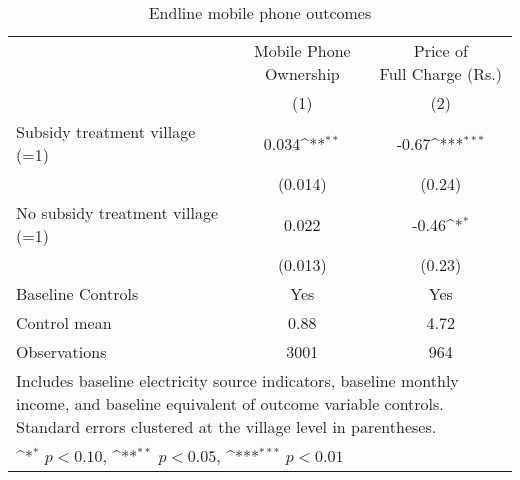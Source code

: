 \begin{table}[htbp]\centering
\def\sym#1{\ifmmode^{#1}\else\(^{#1}\)\fi}
\caption{Endline mobile phone outcomes}

\begin{tabular}{l*{2}{c}}
\toprule
& \shortstack{Mobile Phone\\Ownership} & \shortstack{Price of\\Full Charge (Rs.)}\\
& (1) & (2)\\ \hline
Subsidy treatment village (=1)&    0.034\sym{**} &    -0.67\sym{***}\\
                &  (0.014)         &   (0.24)         \\
No subsidy treatment village (=1)&    0.022         &    -0.46\sym{*}  \\
                &  (0.013)         &   (0.23)         \\
                \addlinespace
Baseline Controls &      Yes         &      Yes         \\

Control mean           &     0.88         &     4.72         \\
Observations    &     3001         &      964         \\
\bottomrule
\multicolumn{3}{p{\textwidth}}{\footnotesize Includes baseline electricity source indicators, baseline monthly income, and baseline equivalent of outcome variable controls. Standard errors clustered at the village level in parentheses.}\\
\multicolumn{3}{p{\textwidth}}{\footnotesize \sym{*} \(p<0.10\), \sym{**} \(p<0.05\), \sym{***} \(p<0.01\)}\\
\end{tabular}
\end{table}
